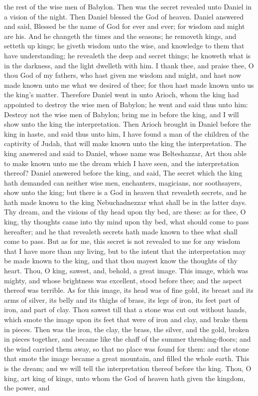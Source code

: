 the rest of the wise men of Babylon. Then was the secret revealed unto Daniel in a vision of the night. Then Daniel blessed the God of heaven. Daniel answered and said, Blessed be the name of God for ever and ever; for wisdom and might are his. And he changeth the times and the seasons; he removeth kings, and setteth up kings; he giveth wisdom unto the wise, and knowledge to them that have understanding; he revealeth the deep and secret things; he knoweth what is in the darkness, and the light dwelleth with him. I thank thee, and praise thee, O thou God of my fathers, who hast given me wisdom and might, and hast now made known unto me what we desired of thee; for thou hast made known unto us the king’s matter. Therefore Daniel went in unto Arioch, whom the king had appointed to destroy the wise men of Babylon; he went and said thus unto him: Destroy not the wise men of Babylon; bring me in before the king, and I will show unto the king the interpretation.  Then Arioch brought in Daniel before the king in haste, and said thus unto him, I have found a man of the children of the captivity of Judah, that will make known unto the king the interpretation. The king answered and said to Daniel, whose name was Belteshazzar, Art thou able to make known unto me the dream which I have seen, and the interpretation thereof? Daniel answered before the king, and said, The secret which the king hath demanded can neither wise men, enchanters, magicians, nor soothsayers, show unto the king; but there is a God in heaven that revealeth secrets, and he hath made known to the king Nebuchadnezzar what shall be in the latter days. Thy dream, and the visions of thy head upon thy bed, are these: as for thee, O king, thy thoughts came into thy mind upon thy bed, what should come to pass hereafter; and he that revealeth secrets hath made known to thee what shall come to pass. But as for me, this secret is not revealed to me for any wisdom that I have more than any living, but to the intent that the interpretation may be made known to the king, and that thou mayest know the thoughts of thy heart.  Thou, O king, sawest, and, behold, a great image. This image, which was mighty, and whose brightness was excellent, stood before thee; and the aspect thereof was terrible. As for this image, its head was of fine gold, its breast and its arms of silver, its belly and its thighs of brass, its legs of iron, its feet part of iron, and part of clay. Thou sawest till that a stone was cut out without hands, which smote the image upon its feet that were of iron and clay, and brake them in pieces. Then was the iron, the clay, the brass, the silver, and the gold, broken in pieces together, and became like the chaff of the summer threshing-floors; and the wind carried them away, so that no place was found for them: and the stone that smote the image became a great mountain, and filled the whole earth.  This is the dream; and we will tell the interpretation thereof before the king. Thou, O king, art king of kings, unto whom the God of heaven hath given the kingdom, the power, and 